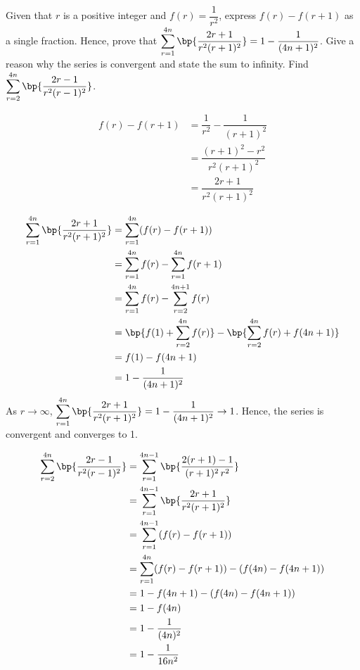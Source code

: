 \documentclass{echw}
\begin{document}
    \problem{}
        Given that $r$ is a positive integer and $f(r) = \dfrac1{r^2}$, express $f(r) - f(r+1)$ as a single fraction. Hence, prove that $\displaystyle\sum\limits_{r=1}^{4n} \bp{\dfrac{2r+1}{r^2(r+1)^2}} = 1 - \dfrac1{(4n+1)^2}$. Give a reason why the series is convergent and state the sum to infinity. Find $\displaystyle\sum\limits_{r=2}^{4n} \bp{\dfrac{2r-1}{r^2(r-1)^2}}$.

    \solution
        \begin{align*}
            f(r) - f(r+1) &= \dfrac1{r^2} - \dfrac1{(r+1)^2}\\
            &= \dfrac{(r+1)^2 - r^2}{r^2(r+1)^2}\\
            &= \dfrac{2r+1}{r^2(r+1)^2}
        \end{align*}


        \begin{align*}
            \sum\limits_{r=1}^{4n} \bp{\dfrac{2r+1}{r^2(r+1)^2}} &= \sum\limits_{r=1}^{4n} (f(r) - f(r+1))\\
            &= \sum\limits_{r=1}^{4n} f(r) - \sum\limits_{r=1}^{4n} f(r+1)\\
            &= \sum\limits_{r=1}^{4n} f(r) - \sum\limits_{r=2}^{4n+1} f(r)\\
            &= \bp{f(1) + \sum\limits_{r=2}^{4n} f(r)} - \bp{\sum\limits_{r=2}^{4n} f(r) + f(4n+1)}\\
            &= f(1) - f(4n+1)\\
            &= 1 - \dfrac{1}{(4n+1)^2}
        \end{align*}
        As $r \to \infty$, $\displaystyle\sum\limits_{r=1}^{4n} \bp{\dfrac{2r+1}{r^2(r+1)^2}} = 1 - \dfrac{1}{(4n+1)^2} \to 1$. Hence, the series is convergent and converges to 1.


        \begin{align*}
            \sum\limits_{r=2}^{4n} \bp{\dfrac{2r-1}{r^2(r-1)^2}} &= \sum\limits_{r=1}^{4n-1} \bp{\dfrac{2(r+1)-1}{(r+1)^2 \, r^2}}\\
            &= \sum\limits_{r=1}^{4n-1} \bp{\dfrac{2r+1}{r^2(r+1)^2}}\\
            &= \sum\limits_{r=1}^{4n-1} (f(r) - f(r+1))\\
            &= \sum\limits_{r=1}^{4n} (f(r) - f(r+1)) - (f(4n) - f(4n+1))\\
            &= 1 - f(4n+1) - (f(4n) - f(4n+1))\\
            &= 1 - f(4n)\\
            &= 1 - \dfrac1{(4n)^2}\\
            &= 1 - \dfrac1{16n^2}
        \end{align*}
\end{document}
